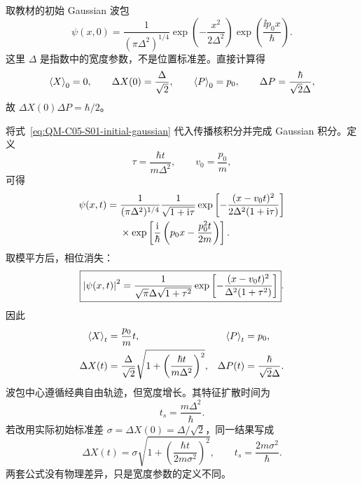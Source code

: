 

取教材的初始 Gaussian 波包
\begin{equation}
  \psi(x,0)
  =\frac{1}{(\pi\Delta^2)^{1/4}}
  \exp\left(-\frac{x^2}{2\Delta^2}\right)
  \exp\left(\frac{\ii p_0x}{\hbar}\right).
  \label{eq:QM-C05-S01-initial-gaussian}
\end{equation}
这里 $\Delta$ 是指数中的宽度参数，不是位置标准差。直接计算得
\begin{equation}
  \left\langle X \right\rangle_0=0,
  \qquad
  \Delta X(0)=\frac{\Delta}{\sqrt2},
  \qquad
  \left\langle P \right\rangle_0=p_0,
  \qquad
  \Delta P=\frac{\hbar}{\sqrt2\Delta},
  \label{eq:QM-C05-S01-gaussian-initial-moments}
\end{equation}
故 $\Delta X(0)\Delta P=\hbar/2$。

将式~\eqref{eq:QM-C05-S01-initial-gaussian} 代入传播核积分并完成 Gaussian 积分。定义
\begin{equation}
  \tau=\frac{\hbar t}{m\Delta^2},
  \qquad
  v_0=\frac{p_0}{m},
  \label{eq:QM-C05-S01-gaussian-tau}
\end{equation}
可得
\begin{align}
  \psi(x,t)
  ={}&\frac{1}{(\pi\Delta^2)^{1/4}}
  \frac{1}{\sqrt{1+\mathrm{i}\tau}}
  \exp\left[-\frac{(x-v_0t)^2}{2\Delta^2(1+\mathrm{i}\tau)}\right]
  \notag\\
  &\times
  \exp\left[\frac{\mathrm{i}}{\hbar}
  \left(p_0x-\frac{p_0^2t}{2m}\right)\right].
  \label{eq:QM-C05-S01-gaussian-evolution}
\end{align}
取模平方后，相位消失：
\begin{equation}
  \boxed{
  \left|\psi(x,t)\right|^2
  =\frac{1}{\sqrt\pi\Delta\sqrt{1+\tau^2}}
  \exp\left[-\frac{(x-v_0t)^2}
  {\Delta^2(1+\tau^2)}\right]}.
  \label{eq:QM-C05-S01-gaussian-density}
\end{equation}
因此
\begin{align}
  \left\langle X \right\rangle_t&=\frac{p_0}{m}t,
  &
  \left\langle P \right\rangle_t&=p_0,
  \label{eq:QM-C05-S01-gaussian-centers}\\
  \Delta X(t)
  &=\frac{\Delta}{\sqrt2}
  \sqrt{1+\left(\frac{\hbar t}{m\Delta^2}\right)^2},
  &
  \Delta P(t)&=\frac{\hbar}{\sqrt2\Delta}.
  \label{eq:QM-C05-S01-gaussian-widths}
\end{align}
波包中心遵循经典自由轨迹，但宽度增长。其特征扩散时间为
\begin{equation}
  t_s=\frac{m\Delta^2}{\hbar}.
  \label{eq:QM-C05-S01-spreading-time}
\end{equation}
若改用实际初始标准差 $\sigma=\Delta X(0)=\Delta/\sqrt2$，同一结果写成
\begin{equation}
  \Delta X(t)=\sigma
  \sqrt{1+\left(\frac{\hbar t}{2m\sigma^2}\right)^2},
  \qquad
  t_s=\frac{2m\sigma^2}{\hbar}.
  \label{eq:QM-C05-S01-gaussian-sigma-convention}
\end{equation}
两套公式没有物理差异，只是宽度参数的定义不同。

